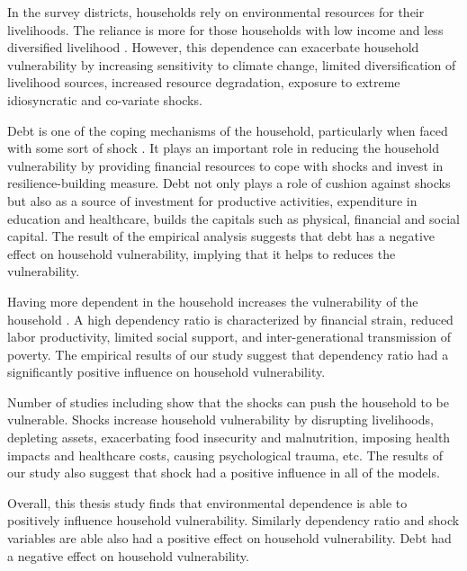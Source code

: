 In the survey districts, households rely on environmental resources for their livelihoods. The reliance is more for those households with low income and less diversified livelihood \citep{walelign2020environmental}. However, this dependence can exacerbate household vulnerability by increasing sensitivity to climate change, limited diversification of livelihood sources, increased resource degradation, exposure to extreme idiosyncratic and co-variate shocks.

Debt is one of the coping mechanisms of the household, particularly when faced with some sort of shock \citep{rabbani2021role}. It plays an important role in reducing the household vulnerability by providing financial resources to cope with shocks and invest in resilience-building measure. Debt not only plays a role of cushion against shocks but also as a source of investment for productive activities, expenditure in education and healthcare, builds the capitals such as physical, financial and social capital. The result of the empirical analysis suggests that debt has a negative effect on household vulnerability, implying that it helps to reduces the vulnerability.



Having more dependent in the household increases the vulnerability of the household \citep{rabbani2021role, sun2020nexus}. A high dependency ratio is characterized by financial strain, reduced labor productivity, limited social support, and inter-generational transmission of poverty.  The empirical results of our study suggest that dependency ratio had a significantly positive influence on household vulnerability.


Number of studies including \cite{buhler2018shocks, barua2020impact, volker2010rural} show that the shocks can push the household to be vulnerable. Shocks increase household vulnerability by disrupting livelihoods, depleting assets, exacerbating food insecurity and malnutrition, imposing health impacts and healthcare costs, causing psychological trauma, etc. The results of our study also suggest that shock had a positive influence in all of the models.

Overall, this thesis study finds that environmental dependence is able to positively influence household vulnerability. Similarly dependency ratio and shock variables are able also had a positive effect on household vulnerability. Debt had a negative effect on household vulnerability.   



